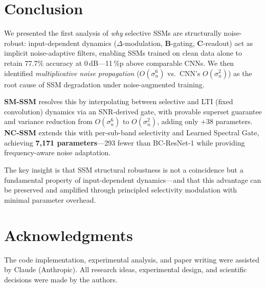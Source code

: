 \documentclass[journal]{IEEEtran}
\begin{document}
\section{Conclusion}
\label{sec:conclusion}

We presented the first analysis of \emph{why} selective SSMs are structurally noise-robust: input-dependent dynamics ($\Delta$-modulation, $\mathbf{B}$-gating, $\mathbf{C}$-readout) act as implicit noise-adaptive filters, enabling SSMs trained on clean data alone to retain 77.7\% accuracy at 0\,dB---11\,\%p above comparable CNNs.
We then identified \emph{multiplicative noise propagation} ($O(\sigma_n^6)$ vs.\ CNN's $O(\sigma_n^2)$) as the root cause of SSM degradation under noise-augmented training.

\textbf{SM-SSM} resolves this by interpolating between selective and LTI (fixed convolution) dynamics via an SNR-derived gate, with provable superset guarantee and variance reduction from $O(\sigma_n^6)$ to $O(\sigma_n^2)$, adding only +38 parameters.
\textbf{NC-SSM} extends this with per-sub-band selectivity and Learned Spectral Gate, achieving \textbf{7{,}171 parameters}---293 fewer than BC-ResNet-1 while providing frequency-aware noise adaptation.


The key insight is that SSM structural robustness is not a coincidence but a fundamental property of input-dependent dynamics---and that this advantage can be preserved and amplified through principled selectivity modulation with minimal parameter overhead.


\section*{Acknowledgments}
The code implementation, experimental analysis, and paper writing were assisted by Claude (Anthropic).
All research ideas, experimental design, and scientific decisions were made by the authors.




\end{document}
